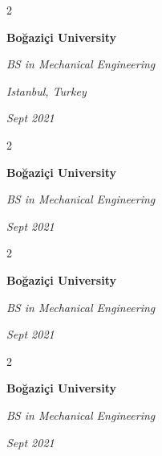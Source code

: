 \documentclass[10pt, letterpaper]{article}
\newenvironment{twocolentry}[2][]{
    \onecolentry
    \def\secondColumn{#2}
    \setcolumnwidth{\fill, 4.5 cm}
    \begin{paracol}{2}
}{
    \switchcolumn \raggedleft \secondColumn
    \end{paracol}
    \endonecolentry
} %
\begin{document}
        \vspace{0.2 cm}

        \begin{twocolentry}{
        \textit{Istanbul, Turkey}    
            
        \textit{Sept 2021}}
            \textbf{Boğaziçi University}

            \textit{BS in Mechanical Engineering}
        \end{twocolentry}



        \vspace{0.2 cm}

        \begin{twocolentry}{
            
            
        \textit{Sept 2021}}
            \textbf{Boğaziçi University}

            \textit{BS in Mechanical Engineering}
        \end{twocolentry}



        \vspace{0.2 cm}

        \begin{twocolentry}{
            
            
        \textit{Sept 2021}}
            \textbf{Boğaziçi University}

            \textit{BS in Mechanical Engineering}
        \end{twocolentry}



        \vspace{0.2 cm}

        \begin{twocolentry}{
            
            
        \textit{Sept 2021}}
            \textbf{Boğaziçi University}

            \textit{BS in Mechanical Engineering}
        \end{twocolentry}
\end{document}
